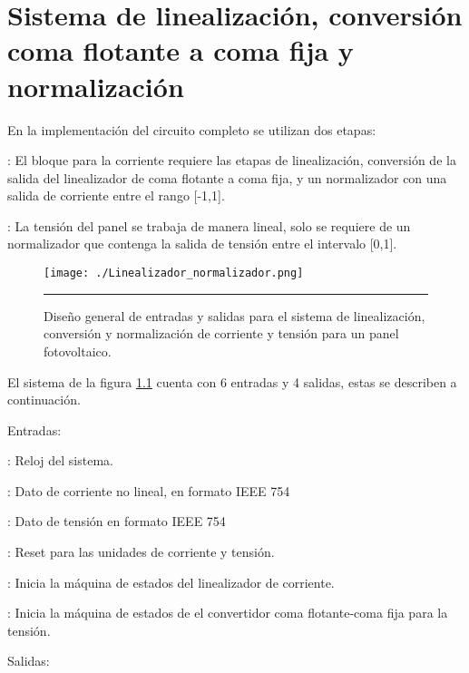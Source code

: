 \chapter{Sistema de linealización, conversión coma flotante a coma fija y normalización}

En la implementación del circuito completo se utilizan dos etapas:

\begin{compactitem}

\item {}: El bloque para la corriente requiere las etapas de linealización, conversión de la salida del linealizador de coma flotante a coma fija, y un normalizador con una salida de corriente entre el rango [-1,1].

\item {}: La tensión del panel se trabaja de manera lineal, solo se requiere de un normalizador que contenga la salida de tensión entre el intervalo [0,1]. 

\end{compactitem}

\begin{figure}[H]
  \centering
    \texttt{[image: ./Linealizador\_normalizador.png]}
    \rule{35em}{0.5pt}
  \caption[Diseño general de entradas y salidas para el sistema  de linealización, conversión y normalización de corriente y tensión para un panel fotovoltaico]{Diseño general de entradas y salidas para el sistema  de linealización, conversión y normalización de corriente y tensión para un panel fotovoltaico.}
  \label{fig:Sist1}
\end{figure}


El sistema de la figura \ref{fig:Sist1} cuenta con 6 entradas y 4 salidas, estas se describen a continuación. 

Entradas:
\begin{compactitem}

\item {}: Reloj del sistema.
\item {}: Dato de corriente no lineal, en formato IEEE 754
\item {}: Dato de tensión en formato IEEE 754
\item {}: Reset para las unidades de corriente y tensión. 
\item {}: Inicia la máquina de estados del linealizador de corriente. 
\item {}: Inicia la máquina de estados de el convertidor coma flotante-coma fija para la tensión. 

\end{compactitem}
Salidas:

